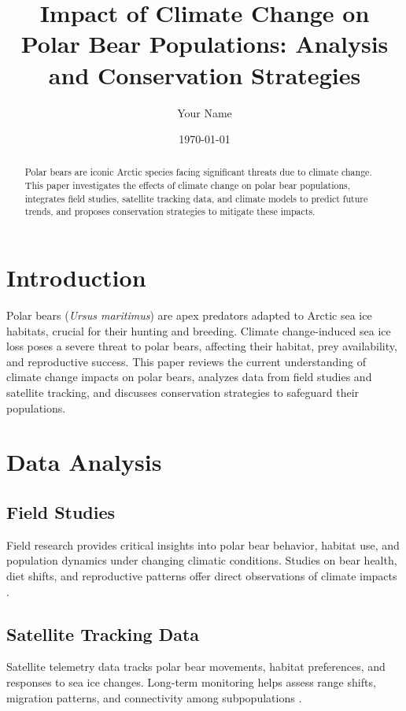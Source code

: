 \documentclass[12pt]{article}
\title{Impact of Climate Change on Polar Bear Populations: Analysis and Conservation Strategies}
\author{Your Name}
\date{\today}
\begin{document}
\maketitle

\begin{abstract}
Polar bears are iconic Arctic species facing significant threats due to climate change. This paper investigates the effects of climate change on polar bear populations, integrates field studies, satellite tracking data, and climate models to predict future trends, and proposes conservation strategies to mitigate these impacts.
\end{abstract}

\section{Introduction}
Polar bears (\textit{Ursus maritimus}) are apex predators adapted to Arctic sea ice habitats, crucial for their hunting and breeding. Climate change-induced sea ice loss poses a severe threat to polar bears, affecting their habitat, prey availability, and reproductive success. This paper reviews the current understanding of climate change impacts on polar bears, analyzes data from field studies and satellite tracking, and discusses conservation strategies to safeguard their populations.

\section{Data Analysis}
\subsection{Field Studies}
Field research provides critical insights into polar bear behavior, habitat use, and population dynamics under changing climatic conditions. Studies on bear health, diet shifts, and reproductive patterns offer direct observations of climate impacts \citep{stirling1999effects, amstrup2000climate}.

\subsection{Satellite Tracking Data}
Satellite telemetry data tracks polar bear movements, habitat preferences, and responses to sea ice changes. Long-term monitoring helps assess range shifts, migration patterns, and connectivity among subpopulations \citep{atwood2016rapid, lunn2016polar}.
\end{document}
